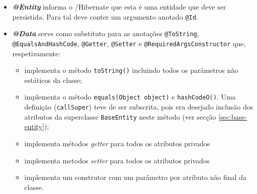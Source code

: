 \begin{itemize}
    \item \textbf{\textit{@Entity}} informa o /\gls{Hibernate} que esta é uma entidade que deve ser persistida. Para tal deve conter um argumento anotado \lstinline|@Id|.
    \item \textbf{\textit{@Data}}\cite{docs-annotation-data} serve como substituto para as anotações \lstinline|@ToString|, \lstinline|@EqualsAndHashCode|, \lstinline|@Getter|, \lstinline|@Setter| e \lstinline|@RequiredArgsConstructor| que, respetivamente: 
    
    \begin{itemize}
        \item implementa o método \lstinline|toString()| incluindo todos os parâmetros não estáticos da classe;
        \item implementa o método \lstinline|equals(Object object)| e \lstinline|hashCodeO()|. Uma definição (\lstinline|callSuper|) teve de ser subscrita, pois era desejado inclusão dos atributos da superclasse \lstinline|BaseEntity| neste método (ver secção \ref{sec:base-entity});
        \item implementa métodos \textit{getter} para todos os atributos privados
        \item implementa metodos \textit{setter} para todos os atributos privados
        \item implementa um construtor com um parâmetro por atributo não final da classe.
    \end{itemize}

\end{itemize}


